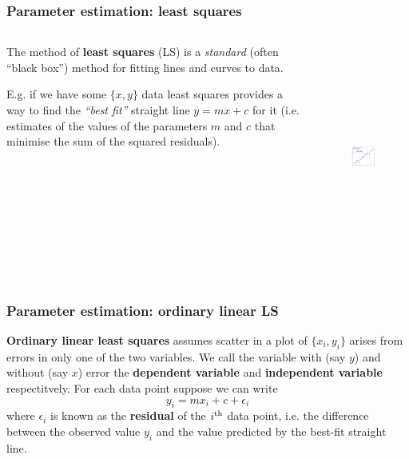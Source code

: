 \begin{frame}

\frametitle{Parameter estimation: least squares}
\label{parameterestimation:leastsquares}

\begin{columns}
\begin{column}{0.45\textwidth}

The method of \textbf{least squares} (LS) is a \emph{standard} (often ``black box'') method for fitting lines and
curves to data.

E.g. if we have some $\{x, y\}$ data least squares provides a way to find the \emph{``best fit''}
straight line $y = mx+c$ for it (i.e. estimates of the
values of the parameters $m$ and $c$ that minimise the sum of the squared residuals).
\end{column}
\begin{column}{0.55\textwidth}

\begin{figure}[htbp]
\centering
\includegraphics[keepaspectratio,width=\textwidth,height=210pt]{figures/linear_data.pdf}
\label{linear_data}
\end{figure}

\end{column}
\end{columns}

\end{frame}

\begin{frame}

\frametitle{Parameter estimation: ordinary linear LS}
\label{parameterestimation:ordinarylinearls}

\textbf{Ordinary linear least squares} assumes scatter in a plot of $\{x_i,y_i\}$ arises from errors in only one
of the two variables. We call the variable with (say $y$) and without (say $x$) error the
\textbf{dependent variable} and \textbf{independent variable} respectitvely. For each data point suppose we can write
\[
y_i = mx_i + c + \epsilon_i 
\]
where $\epsilon_i$ is known as the \textbf{residual} of the $i^{\rm th}$ data point, i.e. the difference
between the observed value $y_i$ and the value predicted by the best-fit straight line.

\end{frame}


